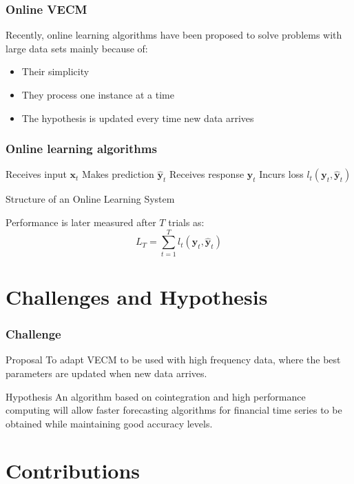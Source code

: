 \documentclass{beamer}
\begin{document}
\begin{frame}
\frametitle{Online VECM}
Recently, online learning algorithms have been proposed to solve problems with large data sets mainly because of: 
\begin{itemize}
\item Their simplicity
\item They process one instance at a time
\item The hypothesis is updated every time new data arrives
\end{itemize} 
\end{frame}

\begin{frame}
\frametitle{Online learning algorithms}
\begin{algorithm}[H]
\begin{algorithmic}[1]
    \STATE Receives input $\mathbf{x}_t$
    \STATE Makes prediction $\mathbf{\hat{y}}_t$
    \STATE Receives response $\mathbf{y}_t$
    \STATE Incurs loss $l_t(\mathbf{y}_t,\mathbf{\hat{y}}_t)$
\end{algorithmic}
\caption{Structure of an Online Learning System}
\end{algorithm}
Performance is later measured after $T$ trials as:
\begin{equation*}
L_T = \sum_{t=1}^T l_t(\mathbf{y}_t,\mathbf{\hat{y}}_t)
\end{equation*}
\end{frame}


\section{Challenges and Hypothesis}
\begin{frame}
\frametitle{Challenge}
\begin{block}{Proposal}
To adapt VECM to be used with high frequency data, where the best parameters are updated when new data arrives.
\end{block}
\begin{exampleblock}{Hypothesis}
An algorithm based on cointegration and high performance computing will allow faster forecasting
algorithms for financial time series to be obtained while maintaining good accuracy levels.
\end{exampleblock}
\end{frame}

\section{Contributions}
\end{document}
